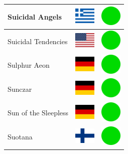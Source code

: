 \documentclass[12pt, a4paper, twoside]{report}
\begin{document}
\begin{center}
\begin{longtable}{|p{5cm}|p{2cm}|p{2cm}|}
 Suicidal Angels                                            & \includegraphics[width=1cm]{../4x3/gr} &   \includegraphics[width=1cm]{../likes/y} \\ \hline
 Suicidal Tendencies                                        & \includegraphics[width=1cm]{../4x3/us} &   \includegraphics[width=1cm]{../likes/y} \\ \hline
 Sulphur Aeon                                               & \includegraphics[width=1cm]{../4x3/de} &   \includegraphics[width=1cm]{../likes/y} \\ \hline
 Sunczar                                                    & \includegraphics[width=1cm]{../4x3/de} &   \includegraphics[width=1cm]{../likes/y} \\ \hline
 Sun of the Sleepless                                       & \includegraphics[width=1cm]{../4x3/de} &   \includegraphics[width=1cm]{../likes/y} \\ \hline
 Suotana                                                    & \includegraphics[width=1cm]{../4x3/fi} &   \includegraphics[width=1cm]{../likes/y} \\ \hline

\end{longtable}
\end{center}
\end{document}
